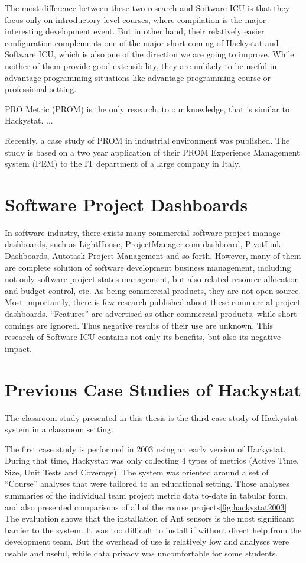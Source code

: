The most difference between these two research and Software ICU is that they focus only on introductory level courses, where compilation is the major interesting development event. But in other hand, their relatively easier configuration complements one of the major short-coming of Hackystat and Software ICU, which is also one of the direction we are going to improve. While neither of them provide good extensibility, they are unlikely to be useful in advantage programming situations like advantage programming course or professional setting.

PRO Metric (PROM) \cite{prom03} is the only research, to our knowledge, that is similar to Hackystat. ...

Recently, a case study of PROM in industrial environment was published\cite{prom09}. The study is based on a two year application of their PROM Experience Management system (PEM)\cite{pem08} to the IT department of a large company in Italy.

\section {Software Project Dashboards}
In software industry, there exists many commercial software project manage dashboards, such as LightHouse, ProjectManager.com dashboard, PivotLink Dashboards, Autotask Project Management and so forth. However, many of them are complete solution of software development business management, including not only software project states management, but also related resource allocation and budget control, etc. As being commercial products, they are not open source. Most importantly, there is few research published about these commercial project dashboards. ``Features'' are advertised as other commercial products, while short-comings are ignored. Thus negative results of their use are unknown. This research of Software ICU contains not only its benefits, but also its negative impact.


\section {Previous Case Studies of Hackystat}
The classroom study presented in this thesis is the third case study of Hackystat system in a classroom setting. 

The first case study is performed in 2003 using an early version of Hackystat\cite{csdl2-03-13}. During that time, Hackystat was only collecting 4 types of metrics (Active Time, Size, Unit Tests and Coverage). The system was oriented around a set of ``Course'' analyses that were tailored to an educational setting. Those analyses summaries of the individual team project metric data to-date in tabular form, and also presented comparisons of all of the course projects\autoref{fig:hackystat2003}. The evaluation shows that the installation of Ant sensors is the most significant barrier to the system. It was too difficult to install if without direct help from the development team. But the overhead of use is relatively low and analyses were usable and useful, while data privacy was uncomfortable for some students.

